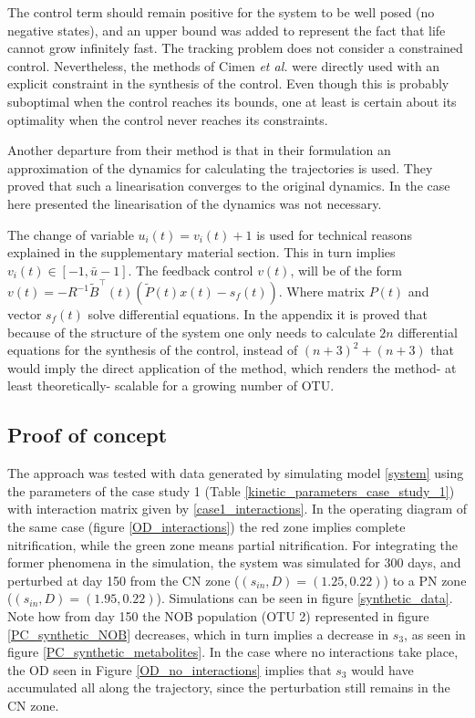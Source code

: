 \documentclass[3p,times]{article}
\begin{document}
The control term should remain positive for the system to be well posed (no negative states), and an upper bound was added to represent the fact that life cannot grow infinitely fast. The tracking problem does not consider a constrained control. Nevertheless, the methods of Cimen \textit{et al.}\cite{Cimen2004} were directly used with an explicit constraint in the synthesis of the control. Even though this is probably suboptimal when the control reaches its bounds, one at least is certain about its optimality when the control never reaches its constraints.

Another departure from their method is that in their formulation an approximation of the dynamics for calculating the trajectories is used. They proved that such a linearisation converges to the original dynamics. In the case here presented the linearisation of the dynamics was not necessary.

The change of variable $u_i(t) = v_i(t) + 1$ is used for technical reasons explained in the supplementary material section. This in turn implies $v_i(t) \in [-1,\bar{u}-1]$. The feedback control $v(t)$, will be of the form $v(t) = -R^{-1}\tilde{B}^ \top(t)\left(\tilde{P}(t)x(t)-s_f(t)\right)$. Where matrix $P(t)$ and vector $s_f(t)$ solve differential equations. In the appendix it is proved that because of the structure of the system one only needs to calculate $2n$ differential equations for the synthesis of the control, instead of $(n+3)^2 + (n+3)$ that would imply the direct application of the method, which renders the method- at least theoretically- scalable for a growing number of OTU.

\subsection{Proof of concept}

The approach was tested with data generated by simulating model \eqref{system} using the parameters of the case study 1 (Table \ref{kinetic_parameters_case_study_1}) with interaction matrix given by \eqref{case1_interactions}. In the operating diagram of the same case (figure \eqref{OD_interactions}) the red zone implies complete nitrification, while the green zone means partial nitrification. For integrating the former phenomena in the simulation, the system was simulated for 300 days, and perturbed at day 150 from the CN zone ($(s_{in},D) = (1.25,0.22)$) to a PN zone ($(s_{in},D) = (1.95,0.22)$). Simulations can be seen in figure \ref{synthetic_data}. Note how from day 150 the NOB population (OTU 2) represented in figure \eqref{PC_synthetic_NOB} decreases, which in turn implies a decrease in $s_3$, as seen in figure \eqref{PC_synthetic_metabolites}. In the case where no interactions take place, the OD seen in Figure \ref{OD_no_interactions} implies that $s_3$ would have accumulated all along the trajectory, since the perturbation still remains in the CN zone.
\end{document}
